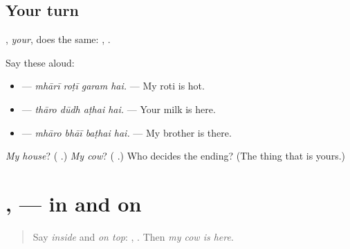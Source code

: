 \subsection*{Your turn}
\textbf{}, \emph{your}, does the same: \textbf{ }, \textbf{ }.

Say these aloud:

\begin{itemize}
\raggedright
  \item \textbf{   } — \emph{mhārī roṭī garam hai.} — My roti is hot.
  \item \textbf{   } — \emph{thāro dūdh aṭhai hai.} — Your milk is here.
  \item \textbf{   } — \emph{mhāro bhāī baṭhai hai.} — My brother is there.
\end{itemize}

\begin{tcolorbox}[breakable,colback=teal!4,colframe=teal!35!black,title={Before you move on}]
\emph{My house}? (\textbf{ }.) \emph{My cow}? (\textbf{ }.) Who decides the ending? (The thing that is yours.)
\end{tcolorbox}
\section[\texorpdfstring{\mw{मांय} · \mw{माथै} (mā̃y · māthai)}{मांय · माथै (mā̃y · māthai)}]{ ,   — in and on}

\label{lesson:MW-C156-maay-mathai}



\begin{quote}
Say \emph{inside} and \emph{on top}: \textbf{}, \textbf{}. Then \emph{my cow is here}.
\end{quote}

